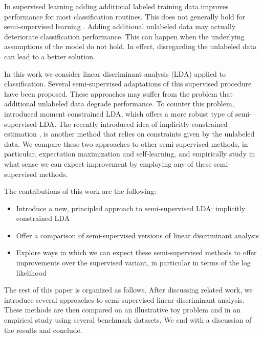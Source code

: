 \documentclass[twoside]{memoir}\usepackage[]{graphicx}\usepackage{xcolor}
\renewcommand{\cite}{\citep}
\begin{document}
In supervised learning adding additional labeled training data improves performance for most classification routines. This does not generally hold for semi-supervised learning \cite{Cozman2006}. Adding additional unlabeled data may actually deteriorate classification performance. This can happen when the underlying assumptions of the model do not hold. In effect, disregarding the unlabeled data can lead to a better solution.

In this work we consider linear discriminant analysis (LDA) applied to classification. Several semi-supervised adaptations of this supervised procedure have been proposed. These approaches may suffer from the problem that additional unlabeled data degrade performance. To counter this problem, \cite{Loog2014a} introduced moment constrained LDA, which offers a more robust type of semi-supervised LDA. The recently introduced idea of implicitly constrained estimation \cite{Krijthe2015}, is another method that relies on constraints given by the unlabeled data. We compare these two approaches to other semi-supervised methods, in particular, expectation maximization and self-learning, and empirically study in what sense we can expect improvement by employing any of these semi-supervised methods.

The contributions of this work are the following:

\begin{itemize}
  \item Introduce a new, principled approach to semi-supervised LDA: implicitly constrained LDA
  \item Offer a comparison of semi-supervised versions of linear discriminant analysis
  \item Explore ways in which we can expect these semi-supervised methods to offer improvements over the supervised variant, in particular in terms of the log likelihood
\end{itemize}

The rest of this paper is organized as follows. After discussing related work, we introduce several approaches to semi-supervised linear discriminant analysis. These methods are then compared on an illustrative toy problem and in an empirical study using several benchmark datasets. We end with a discussion of the results and conclude.
\end{document}
